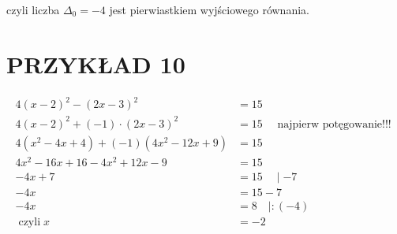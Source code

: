 \documentclass[10pt]{article}
\begin{document}
czyli liczba \(\Delta_{0}=-4\) jest pierwiastkiem wyjściowego równania.

\section*{PRZYKŁAD 10}
\[
\begin{aligned}
4(x-2)^{2}-(2 x-3)^{2} & =15 \\
4(x-2)^{2}+(-1) \cdot(2 x-3)^{2} & =15 \quad \text { najpierw potęgowanie!!! } \\
4\left(x^{2}-4 x+4\right)+(-1)\left(4 x^{2}-12 x+9\right) & =15 \\
4 x^{2}-16 x+16-4 x^{2}+12 x-9 & =15 \\
-4 x+7 & =15 \quad \mid-7 \\
-4 x & =15-7 \\
-4 x & =8 \quad \mid:(-4) \\
\operatorname{czyli} x & =-2
\end{aligned}
\]
\end{document}
